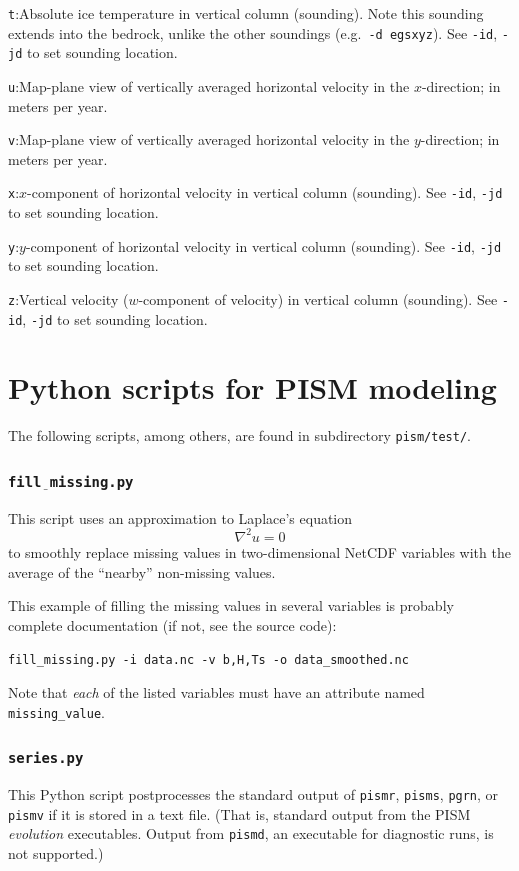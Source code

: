\documentclass[11pt,final]{amsart}
\newcommand{\grad}{\nabla}
\newcommand{\und}{$\underline{\,\,\,}$}
\begin{document}
\verb|t|:\quad Absolute ice temperature in vertical column (sounding).  Note this sounding extends into the bedrock, unlike the other soundings (e.g.~\verb|-d egsxyz|).  See \verb|-id|, \verb|-jd| to set sounding location.

\verb|u|:\quad Map-plane view of vertically averaged horizontal velocity in the $x$-direction;  in meters per year.

\verb|v|:\quad Map-plane view of vertically averaged horizontal velocity in the $y$-direction;  in meters per year.

\verb|x|:\quad $x$-component of horizontal velocity in vertical column (sounding).  See \verb|-id|, \verb|-jd| to set sounding location.

\verb|y|:\quad $y$-component of horizontal velocity in vertical column (sounding).  See \verb|-id|, \verb|-jd| to set sounding location.

\verb|z|:\quad Vertical velocity ($w$-component of velocity) in vertical column (sounding).  See \verb|-id|, \verb|-jd| to set sounding location.



\clearpage \newpage
\section{Python scripts for PISM modeling}\label{sect:scripts}

The following scripts, among others, are found in subdirectory \verb|pism/test/|.

\subsubsection*{\Large{\texttt{fill\und missing.py}}}  This script uses an approximation to Laplace's equation
	$$\grad^2 u = 0$$
to smoothly replace missing values in two-dimensional NetCDF variables with the average of the ``nearby'' non-missing values.

This example of filling the missing values in several variables is probably complete documentation (if not, see the source code):

\verb|fill_missing.py -i data.nc -v b,H,Ts -o data_smoothed.nc|

\noindent Note that \emph{each} of the listed variables must have an attribute named \verb|missing_value|.


\subsubsection*{\Large{\texttt{series.py}}}  This Python script postprocesses the standard output of \verb|pismr|, \verb|pisms|, \verb|pgrn|, or \verb|pismv| if it is stored in a text file.  (That is, standard output from the PISM \emph{evolution} executables.  Output from \verb|pismd|, an executable for diagnostic runs, is not supported.)
\end{document}
